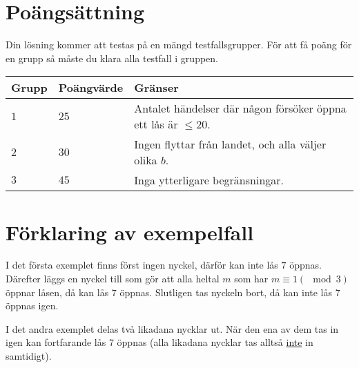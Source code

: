 \section*{Poängsättning}
Din lösning kommer att testas på en mängd testfallsgrupper.
För att få poäng för en grupp så måste du klara alla testfall i gruppen.

\noindent
\begin{tabular}{| l | l | l |}
\hline
Grupp & Poängvärde & Gränser \\ \hline
$1$    & $25$         & Antalet händelser där någon försöker öppna ett lås är $\leq 20$. \\ \hline
$2$    & $30$         & Ingen flyttar från landet, och alla väljer olika $b$. \\ \hline
$3$    & $45$         & Inga ytterligare begränsningar. \\ \hline
\end{tabular}

\section*{Förklaring av exempelfall}
I det första exemplet finns först ingen nyckel, därför kan inte lås $7$ öppnas. Därefter läggs en nyckel till som gör att alla heltal $m$ som har $m\equiv 1 (\mod 3)$ öppnar låsen, då kan lås $7$ öppnas. Slutligen tas nyckeln bort, då kan inte lås $7$ öppnas igen.

I det andra exemplet delas två likadana nycklar ut. När den ena av dem tas in igen kan fortfarande lås $7$ öppnas (alla likadana nycklar tas alltså \underline{inte} in samtidigt).
